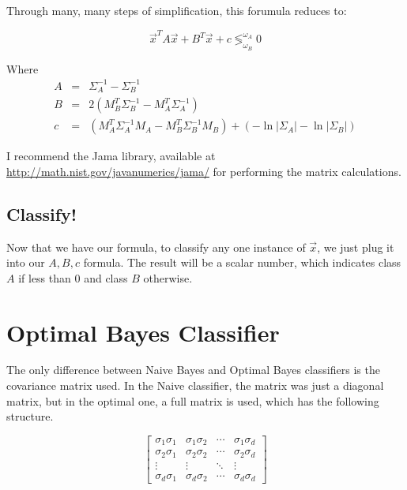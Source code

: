 \documentclass{article}
\begin{document}
Through many, many steps of simplification, this forumula reduces to:

\begin{displaymath}
\vec{x}^{T}A\vec{x} + B^{T}\vec{x} + c  \lessgtr^{\omega_A}_{\omega_B} 0
\end{displaymath}

Where
\begin{eqnarray*}
  A & = & \Sigma^{-1}_A - \Sigma^{-1}_B \\
  B & = & 2(M^{T}_{B}\Sigma^{-1}_B - M^{T}_{A}\Sigma^{-1}_A)\\
  c & = & (M^{T}_{A}\Sigma^{-1}_{A}M_A - M^{T}_{B}\Sigma^{-1}_{B}M_B) + (-\ln{|\Sigma_A|} - \ln{|\Sigma_B|})
\end{eqnarray*}

I recommend the Jama library, available at \href{http://math.nist.gov/javanumerics/jama/}{http://math.nist.gov/javanumerics/jama/} for performing the matrix calculations.

\subsection{Classify!}

Now that we have our formula, to classify any one instance of $\vec{x}$, we just plug it into our $A, B, c$ formula.  The result will be a scalar number, which indicates class $A$ if less than $0$ and class $B$ otherwise.



\section{Optimal Bayes Classifier}
\label{sec:obayes}

The only difference between Naive Bayes and Optimal Bayes classifiers is the covariance matrix used.  In the Naive classifier, the matrix was just a diagonal matrix, but in the optimal one, a full matrix is used, which has the following structure.

\begin{displaymath}
\begin{bmatrix} \sigma_1\sigma_1 & \sigma_1\sigma_2 & \cdots & \sigma_1\sigma_d \\
				 \sigma_2\sigma_1 & \sigma_2\sigma_2 & \cdots & \sigma_2\sigma_d \\
				 \vdots & \vdots & \ddots & \vdots \\
				 \sigma_d\sigma_1 & \sigma_d\sigma_2 & \cdots & \sigma_d\sigma_d
\end{bmatrix}
\end{displaymath}
\end{document}
